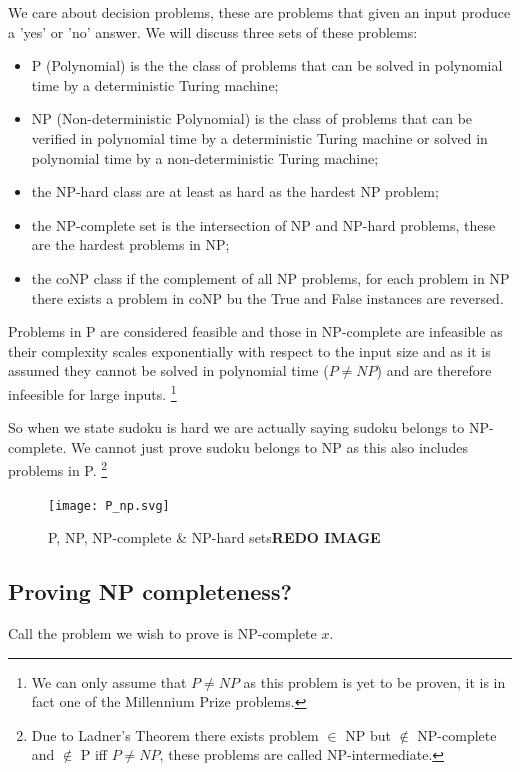 \documentclass[a4paper,11pt]{report}
\begin{document}
We care about decision problems, these are problems that given an input produce a 'yes' or 'no' answer. We will discuss three sets of these problems:
\begin{itemize}
\item{P (Polynomial) is the the class of problems that can be solved in polynomial time by a deterministic Turing machine;}
\item{NP (Non-deterministic Polynomial) is the class of problems that can be verified in polynomial time by a deterministic Turing machine or solved in polynomial time by a non-deterministic Turing machine;}
\item{the NP-hard class are at least as hard as the hardest NP problem;} 
\item{the NP-complete set is the intersection of NP and NP-hard problems, these are the hardest problems in NP;} 
\item{the coNP class if the complement of all NP problems, for each problem in NP there exists a problem in coNP bu the True and False instances are reversed.}
\end{itemize}

Problems in P are considered feasible and those in NP-complete are infeasible as their complexity scales exponentially with respect to the input size and as it is assumed they cannot be solved in polynomial time ($P \neq NP$) and are therefore infeesible for large inputs. \footnote{We can only assume that $P\neq NP$ as this problem is yet to be proven, it is in fact one of the Millennium Prize problems.}

So when we state sudoku is hard we are actually saying sudoku belongs to NP-complete. We cannot just prove sudoku belongs to NP as this also includes problems in P. \footnote{Due to Ladner's Theorem there exists problem $\in$ NP but $\not\in$ NP-complete and $\not\in$ P iff $P\neq NP$, these problems are called NP-intermediate.}

\begin{figure}[h!]
	\begin{center}
		\texttt{[image: P\_np.svg]}
	\end{center}
	\caption{P, NP, NP-complete \& NP-hard sets\textbf{REDO IMAGE}}
\end{figure}

\subsection{Proving NP completeness?}

Call the problem we wish to prove is NP-complete $x$.
\end{document}
